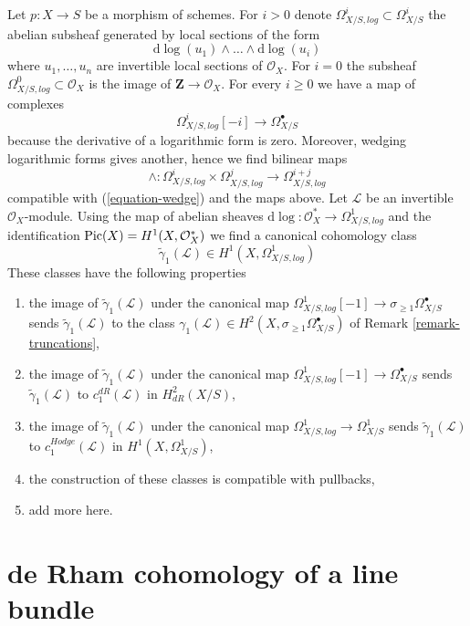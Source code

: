 \begin{remark}
\label{remark-log-forms}
Let $p : X \to S$ be a morphism of schemes. For $i > 0$
denote $\Omega^i_{X/S, log} \subset \Omega^i_{X/S}$ the abelian subsheaf
generated by local sections of the form
$$
\text{d}\log(u_1) \wedge \ldots \wedge \text{d}\log(u_i)
$$
where $u_1, \ldots, u_n$ are invertible local sections of $\mathcal{O}_X$.
For $i = 0$ the subsheaf $\Omega^0_{X/S, log} \subset \mathcal{O}_X$
is the image of $\mathbf{Z} \to \mathcal{O}_X$. For every $i \geq 0$ we
have a map of complexes
$$
\Omega^i_{X/S, log}[-i] \longrightarrow \Omega^\bullet_{X/S}
$$
because the derivative of a logarithmic form is zero. Moreover, wedging
logarithmic forms gives another, hence we find bilinear maps
$$
\wedge :  \Omega^i_{X/S, log} \times
\Omega^j_{X/S, log} \longrightarrow \Omega^{i + j}_{X/S, log}
$$
compatible with (\ref{equation-wedge}) and the maps above.
Let $\mathcal{L}$ be an invertible $\mathcal{O}_X$-module.
Using the map of abelian sheaves
$\text{d}\log : \mathcal{O}_X^* \to \Omega^1_{X/S, log}$
and the identification $\mathop{\mathrm{Pic}}\nolimits(X) = H^1(X, \mathcal{O}_X^*)$
we find a canonical cohomology class
$$
\tilde \gamma_1(\mathcal{L}) \in H^1(X, \Omega^1_{X/S, log})
$$
These classes have the following properties
\begin{enumerate}
\item the image of $\tilde \gamma_1(\mathcal{L})$ under the canonical
map $\Omega^1_{X/S, log}[-1] \to \sigma_{\geq 1}\Omega^\bullet_{X/S}$
sends $\tilde \gamma_1(\mathcal{L})$ to the class
$\gamma_1(\mathcal{L}) \in 
H^2(X, \sigma_{\geq 1}\Omega^\bullet_{X/S})$
of Remark \ref{remark-truncations},
\item the image of $\tilde \gamma_1(\mathcal{L})$ under the canonical
map $\Omega^1_{X/S, log}[-1] \to \Omega^\bullet_{X/S}$
sends $\tilde \gamma_1(\mathcal{L})$ to $c_1^{dR}(\mathcal{L})$ in
$H^2_{dR}(X/S)$,
\item the image of $\tilde \gamma_1(\mathcal{L})$ under the canonical
map $\Omega^1_{X/S, log} \to \Omega^1_{X/S}$
sends $\tilde \gamma_1(\mathcal{L})$ to $c_1^{Hodge}(\mathcal{L})$ in
$H^1(X, \Omega^1_{X/S})$,
\item the construction of these classes is compatible with pullbacks,
\item add more here.
\end{enumerate}
\end{remark}





\section{de Rham cohomology of a line bundle}
\label{section-line-bundle}

